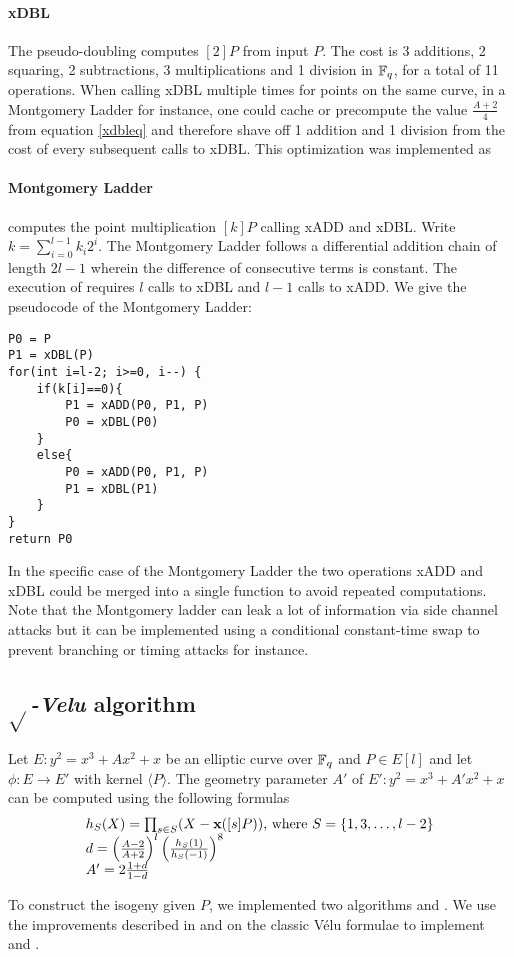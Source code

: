\documentclass[../main.tex]{subfilesubs}
\begin{document}
\paragraph{xDBL}The pseudo-doubling  computes $[2]P$ from input $P$.  The cost is 3 additions, 2 squaring, 2 subtractions, 3 multiplications and 1 division in $\mathbb{F}_q$, for a total of 11 operations. When calling xDBL multiple times for points on the same curve, in a Montgomery Ladder for instance, one could cache or precompute the value $\frac{A+2}{4}$ from equation \eqref{xdbleq} and therefore shave off 1 addition and 1 division from the cost of every subsequent calls to xDBL. This optimization was implemented as 

\paragraph{Montgomery Ladder}  computes the point multiplication $[k]P$ calling xADD and xDBL. Write $k=\sum_{i=0}^{l-1}k_i2^i$. The Montgomery Ladder follows a differential addition chain of length $2l-1$ wherein the difference of consecutive terms is constant. The execution of  requires $l$ calls to xDBL and $l-1$ calls to xADD. We give the pseudocode of the Montgomery Ladder:
\begin{verbatim}
P0 = P
P1 = xDBL(P)
for(int i=l-2; i>=0, i--) {
	if(k[i]==0){
		P1 = xADD(P0, P1, P)
		P0 = xDBL(P0)
	}
	else{
		P0 = xADD(P0, P1, P)
		P1 = xDBL(P1)
	}
}
return P0
\end{verbatim}
In the specific case of the Montgomery Ladder the two operations xADD and xDBL could be merged into a single function to avoid repeated computations.
Note that the Montgomery ladder can leak a lot of information via side channel attacks but it can be implemented using a conditional constant-time swap to prevent branching or timing attacks for instance.

\subsection{$\sqrt{}$\textit{-Velu} algorithm}

\begin{lemma}
	Let $E:y^2=x^3+Ax^2+x$ be an elliptic curve over $\mathbb{F}_q$ and $P\in E[l]$ and let $\phi:E\rightarrow E'$ with kernel $\langle P \rangle$.
	The geometry parameter $A'$ of $E' : y^2=x^3+A'x^2+x$ can be computed using the following formulas
	\begin{equation}\label{veluform}\begin{array}{l}
			h_S(X) = \prod_{s\in S}(X-\textbf{x}([s]P))\text{, where }S=\{1,3, \ldots, l-2\} \\
			d = \left(\frac{A-2}{A+2}\right)^l \left( \frac{h_S(1)}{h_S(-1)}\right)^8\\
			A'=2\frac{1+d}{1-d}
		\end{array}\end{equation}

\end{lemma}
To construct the isogeny given $P$, we implemented two algorithms  and . We use the improvements described in \cite{} and \cite{} on the classic Vélu formulae to implement  and .
\end{document}
